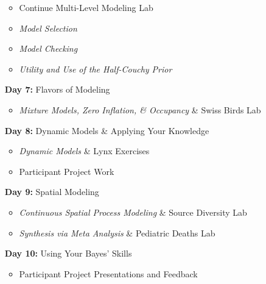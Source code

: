 \documentclass[11pt]{article}
\begin{document}
\begin{enumerate}
\begin{itemize}
\item  Continue Multi-Level Modeling Lab %
\item \emph{Model Selection}%
\item \emph{Model Checking}%
\item \emph{Utility and Use of the Half-Couchy Prior} %
\end{itemize}

\item[\textbf{Day 7:}] Flavors of Modeling

\begin{itemize}
\item \emph{Mixture Models, Zero Inflation, \& Occupancy} \& Swiss Birds Lab %
\end{itemize}

\item[\textbf{Day 8:}] Dynamic Models \& Applying Your Knowledge

\begin{itemize}
\item \emph{Dynamic Models} \& Lynx Exercises %
\item Participant Project Work
\end{itemize}

\item[\textbf{Day 9:}] Spatial Modeling

\begin{itemize}
\item \emph{Continuous Spatial Process Modeling} \& Source Diversity Lab%
\item \emph{Synthesis via Meta Analysis} \& Pediatric Deaths Lab %
\end{itemize}

\item[\textbf{Day 10:}] Using Your Bayes' Skills

\begin{itemize}
\item Participant Project Presentations and Feedback 
\end{itemize}

\end{enumerate}
\end{document}
